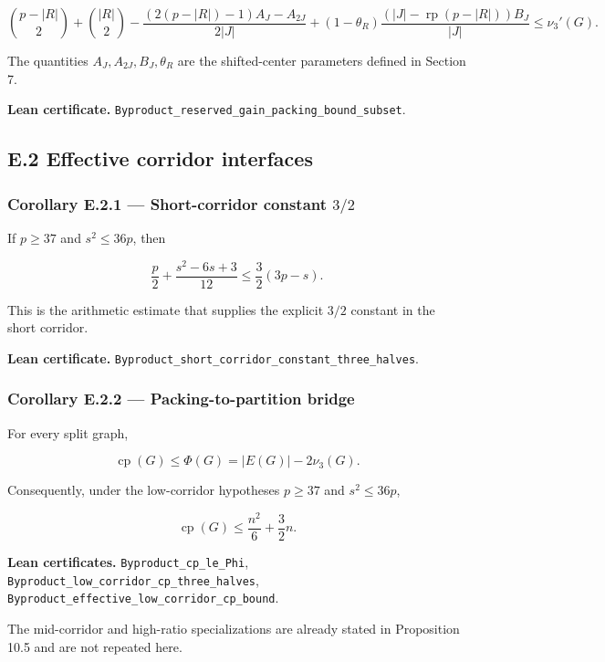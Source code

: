 \documentclass[
  american,
  11pt,
  a4paper,
]{article}
\begin{document}
\[
\binom{p-|R|}{2}+\binom{|R|}{2}
-
\frac{(2(p-|R|)-1)A_J-A_{2J}}{2|J|}
+
(1-\theta_R)\frac{(|J|-\operatorname{rp}(p-|R|))B_J}{|J|}
\le \nu_3'(G).
\]

The quantities \(A_J,A_{2J},B_J,\theta_R\) are the shifted-center parameters defined in Section 7.

\textbf{Lean certificate.} \texttt{Byproduct\_reserved\_gain\_packing\_bound\_subset}.

\subsection{E.2 Effective corridor interfaces}\label{e.2-effective-corridor-interfaces}

\subsubsection{\texorpdfstring{Corollary E.2.1 --- Short-corridor constant \(3/2\)}{Corollary E.2.1 --- Short-corridor constant 3/2}}\label{corollary-e.2.1-short-corridor-constant-32}

If \(p\ge37\) and \(s^2\le36p\), then

\[
\frac p2+\frac{s^2-6s+3}{12}
\le
\frac32(3p-s).
\]

This is the arithmetic estimate that supplies the explicit \(3/2\) constant in the short corridor.

\textbf{Lean certificate.} \texttt{Byproduct\_short\_corridor\_constant\_three\_halves}.

\subsubsection{Corollary E.2.2 --- Packing-to-partition bridge}\label{corollary-e.2.2-packing-to-partition-bridge}

For every split graph,

\[
\operatorname{cp}(G)\le \Phi(G)=|E(G)|-2\nu_3(G).
\]

Consequently, under the low-corridor hypotheses \(p\ge37\) and \(s^2\le36p\),

\[
\operatorname{cp}(G)\le \frac{n^2}{6}+\frac32n.
\]

\textbf{Lean certificates.} \texttt{Byproduct\_cp\_le\_Phi}, \texttt{Byproduct\_low\_corridor\_cp\_three\_halves}, \texttt{Byproduct\_effective\_low\_corridor\_cp\_bound}.

The mid-corridor and high-ratio specializations are already stated in Proposition 10.5 and are not repeated here.
\end{document}
